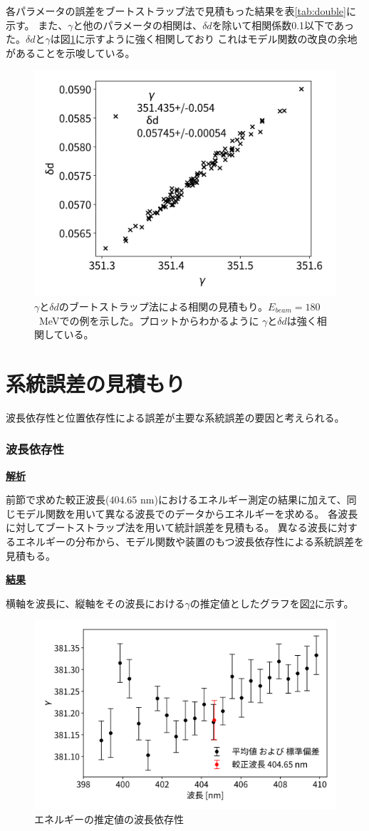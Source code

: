 \documentclass[a4paper,11pt,uplatex]{jsbook}
\begin{document}
各パラメータの誤差をブートストラップ法で見積もった結果を表\ref{tab:double}に示す。
また、$\gamma$と他のパラメータの相関は、$\delta d$を除いて相関係数0.1以下であった。$\delta d$と$\gamma$は図\ref{gamma_phase}に示すように強く相関しており
これはモデル関数の改良の余地があることを示唆している。
\begin{figure}[H]
  \centering
  \includegraphics[width = 0.6\linewidth]{image/4-gamma_phase.png}
  \caption[$\gamma$-$\delta d$相関]{$\gamma$と$\delta d$のブートストラップ法による相関の見積もり。$E_{beam} =180$~MeVでの例を示した。プロットからわかるように
  $\gamma$と$\delta d$は強く相関している。}\label{gamma_phase}
\end{figure}

\section{系統誤差の見積もり}
波長依存性と位置依存性による誤差が主要な系統誤差の要因と考えられる。
\subsubsection{波長依存性}
\noindent \textbf{\underline{解析}}\par
前節で求めた較正波長(404.65 nm)におけるエネルギー測定の結果に加えて、同じモデル関数を用いて異なる波長でのデータからエネルギーを求める。
各波長に対してブートストラップ法を用いて統計誤差を見積もる。
異なる波長に対するエネルギーの分布から、モデル関数や装置のもつ波長依存性による系統誤差を見積もる。

\noindent \textbf{\underline{結果}}\par
横軸を波長に、縦軸をその波長における$\gamma$の推定値としたグラフを図\ref{wldep}に示す。
\begin{figure}[h]
  \centering
  \includegraphics[width=0.8\linewidth]{image/4-wldep.png}
  \caption{エネルギーの推定値の波長依存性}\label{wldep}
\end{figure}
\end{document}

